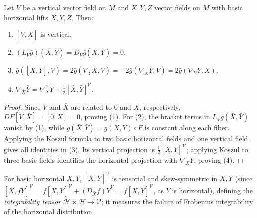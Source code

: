 \begin{proposition}
  \label{prop:pet-ch4-submersion-basic-properties}
  Let $V$ be a vertical vector field on $\bar M$ and $X,Y,Z$ vector fields on
  $M$ with basic horizontal lifts $\bar X,\bar Y,\bar Z$. Then:
  \begin{enumerate}
  \item $[V,\bar X]$ is vertical.
  \item $(L_V\bar g)(\bar X,\bar Y)=D_V\bar g(\bar X,\bar Y)=0$.
  \item $\bar g([\bar X,\bar Y],V)=2\bar g(\nabla_{\bar Y}\bar X,V)=-2\bar g(\nabla_{\bar X}\bar Y,V)=2\bar g(\nabla_VY,X)$.
  \item $\nabla_{\bar X}\bar Y=\overline{\nabla_XY}+\tfrac12[\bar X,\bar Y]^{\mathcal V}$.
  \end{enumerate}
\end{proposition}
\begin{proof}
  \sketch
  Since $V$ and $\bar X$ are related to $0$ and $X$, respectively,
  $DF[V,\bar X]=[0,X]=0$, proving (1). For (2), the bracket terms in
  $L_V\bar g(\bar X,\bar Y)$ vanish by (1), while
  $\bar g(\bar X,\bar Y)=g(X,Y)\circ F$ is constant along each fiber. Applying
  the Koszul formula to two basic horizontal fields and one vertical field
  gives all identities in (3). Its vertical projection is
  $\tfrac12[\bar X,\bar Y]^{\mathcal V}$; applying Koszul to three basic fields
  identifies the horizontal projection with $\overline{\nabla_XY}$, proving
  (4).
\end{proof}


\begin{definition}
  \label{def:pet-ch4-integrability-tensor}
  For basic horizontal $\bar X,\bar Y$, $[\bar X,\bar Y]^{\mathcal V}$ is
  tensorial and skew-symmetric in $\bar X,\bar Y$ (since
  $[\bar X,f\bar Y]^{\mathcal V}=f[\bar X,\bar Y]^{\mathcal V}+(D_{\bar X}f)\bar Y^{\mathcal V}=f[\bar X,\bar Y]^{\mathcal V}$,
  as $\bar Y$ is horizontal), defining the \emph{integrability tensor}
  $\mathcal H\times\mathcal H\to\mathcal V$; it measures the failure of
  Frobenius integrability of the horizontal distribution.
\end{definition}

